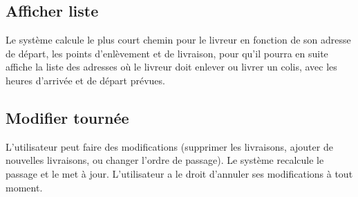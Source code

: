 \documentclass{scrartcl}
\begin{document}
\subsection{Afficher liste}
Le système calcule le plus court chemin pour le livreur en fonction de son adresse de départ, les points d’enlèvement et de livraison, pour qu'il pourra en suite affiche la liste des adresses où le livreur doit enlever ou livrer un colis, avec les heures d'arrivée et de départ prévues.
\subsection{Modifier tournée}
L'utilisateur peut faire des modifications (supprimer les livraisons, ajouter de nouvelles livraisons, ou changer l'ordre de passage). Le système recalcule le passage et le met à jour. L'utilisateur a le droit d'annuler ses modifications à tout moment.
\end{document}
